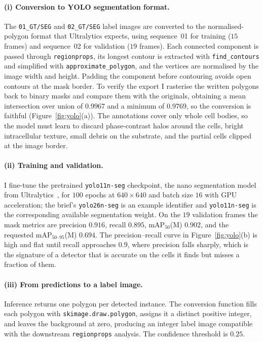 \documentclass[11pt,a4paper]{article}
\begin{document}
\paragraph{(i) Conversion to YOLO segmentation format.}
The \texttt{01\_GT/SEG} and \texttt{02\_GT/SEG} label images are converted to
the normalised-polygon format that Ultralytics expects, using sequence~01 for
training (\(15\) frames) and sequence~02 for validation (\(19\) frames). Each
connected component is passed through \texttt{regionprops}, its longest contour
is extracted with \texttt{find\_contours} and simplified with
\texttt{approximate\_polygon}, and the vertices are normalised by the image
width and height. Padding the component before contouring avoids open contours at
the mask border. To verify the export I rasterise the written polygons back to
binary masks and compare them with the originals, obtaining a mean intersection
over union of \(0.9967\) and a minimum of \(0.9769\), so the conversion is
faithful (Figure~\ref{fig:yolo}(a)). The annotations cover only whole cell
bodies, so the model must learn to discard phase-contrast halos around the
cells, bright intracellular texture, small debris on the substrate, and the
partial cells clipped at the image border.

\paragraph{(ii) Training and validation.}
I fine-tune the pretrained \texttt{yolo11n-seg} checkpoint, the nano
segmentation model from Ultralytics~\cite{ultralytics}, for \(100\) epochs at
\(640\times640\) and batch size \(16\) with GPU acceleration; the brief's
\texttt{yolo26n-seg} is an example identifier and \texttt{yolo11n-seg} is the
corresponding available segmentation weight. On the \(19\) validation frames the
mask metrics are precision \(0.916\), recall \(0.895\), mAP\(_{50}\)(M)
\(0.902\), and the requested mAP\(_{50\text{--}95}\)(M) \(0.694\). The
precision--recall curve in Figure~\ref{fig:yolo}(b) is high and flat until recall
approaches \(0.9\), where precision falls sharply, which is the signature of a
detector that is accurate on the cells it finds but misses a fraction of them.

\paragraph{(iii) From predictions to a label image.}
Inference returns one polygon per detected instance. The conversion function
fills each polygon with \texttt{skimage.draw.polygon}, assigns it a distinct
positive integer, and leaves the background at zero, producing an integer label
image compatible with the downstream \texttt{regionprops} analysis. The
confidence threshold is \(0.25\).
\end{document}

